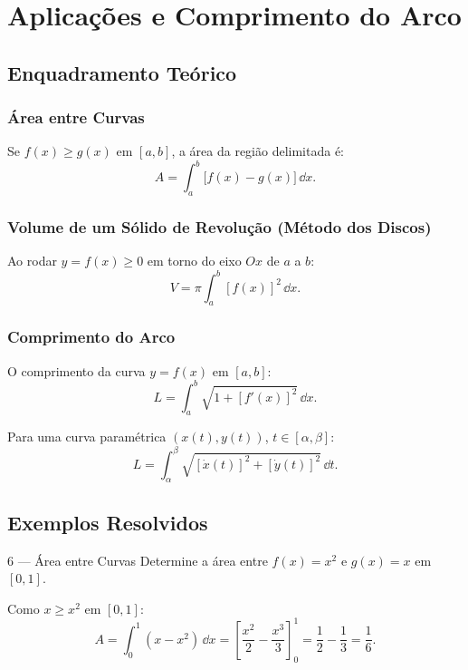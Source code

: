 
\section{Aplicações e Comprimento do Arco}

\subsection{Enquadramento Teórico}

\subsubsection*{Área entre Curvas}

Se $f(x)\geq g(x)$ em $[a,b]$, a área da região delimitada é:
\[
  A = \int_a^b \bigl[f(x)-g(x)\bigr]\,\dd x.
\]

\subsubsection*{Volume de um Sólido de Revolução (Método dos Discos)}

Ao rodar $y=f(x)\geq 0$ em torno do eixo $Ox$ de $a$ a $b$:
\[
  V = \pi\int_a^b [f(x)]^2\,\dd x.
\]

\subsubsection*{Comprimento do Arco}

O comprimento da curva $y=f(x)$ em $[a,b]$:
\[
  L = \int_a^b \sqrt{1+[f'(x)]^2}\,\dd x.
\]

Para uma curva paramétrica $(x(t),y(t))$, $t\in[\alpha,\beta]$:
\[
  L = \int_\alpha^\beta \sqrt{[\dot x(t)]^2+[\dot y(t)]^2}\,\dd t.
\]

\subsection{Exemplos Resolvidos}

\begin{exbox}{6 --- Área entre Curvas}
  Determine a área entre $f(x)=x^2$ e $g(x)=x$ em $[0,1]$.
\end{exbox}
\begin{solbox}
  Como $x\geq x^2$ em $[0,1]$:
  \[
    A = \int_0^1(x-x^2)\,\dd x = \left[\frac{x^2}{2}-\frac{x^3}{3}\right]_0^1
      = \frac{1}{2}-\frac{1}{3} = \frac{1}{6}.
  \]
\end{solbox}

